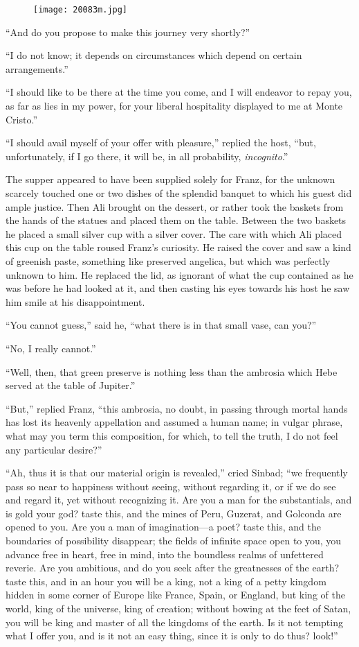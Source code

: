 \begin{figure}[ht]
\texttt{[image: 20083m.jpg]}
\end{figure}

“And do you propose to make this journey very shortly?”

“I do not know; it depends on circumstances which depend on certain
arrangements.”

“I should like to be there at the time you come, and I will endeavor to
repay you, as far as lies in my power, for your liberal hospitality
displayed to me at Monte Cristo.”

“I should avail myself of your offer with pleasure,” replied the host,
“but, unfortunately, if I go there, it will be, in all probability,
\textit{incognito}.”

The supper appeared to have been supplied solely for Franz, for the
unknown scarcely touched one or two dishes of the splendid banquet to
which his guest did ample justice. Then Ali brought on the dessert, or
rather took the baskets from the hands of the statues and placed them
on the table. Between the two baskets he placed a small silver cup with
a silver cover. The care with which Ali placed this cup on the table
roused Franz’s curiosity. He raised the cover and saw a kind of
greenish paste, something like preserved angelica, but which was
perfectly unknown to him. He replaced the lid, as ignorant of what the
cup contained as he was before he had looked at it, and then casting
his eyes towards his host he saw him smile at his disappointment.

“You cannot guess,” said he, “what there is in that small vase, can
you?”

“No, I really cannot.”

“Well, then, that green preserve is nothing less than the ambrosia
which Hebe served at the table of Jupiter.”

“But,” replied Franz, “this ambrosia, no doubt, in passing through
mortal hands has lost its heavenly appellation and assumed a human
name; in vulgar phrase, what may you term this composition, for which,
to tell the truth, I do not feel any particular desire?”

“Ah, thus it is that our material origin is revealed,” cried Sinbad;
“we frequently pass so near to happiness without seeing, without
regarding it, or if we do see and regard it, yet without recognizing
it. Are you a man for the substantials, and is gold your god? taste
this, and the mines of Peru, Guzerat, and Golconda are opened to you.
Are you a man of imagination—a poet? taste this, and the boundaries of
possibility disappear; the fields of infinite space open to you, you
advance free in heart, free in mind, into the boundless realms of
unfettered reverie. Are you ambitious, and do you seek after the
greatnesses of the earth? taste this, and in an hour you will be a
king, not a king of a petty kingdom hidden in some corner of Europe
like France, Spain, or England, but king of the world, king of the
universe, king of creation; without bowing at the feet of Satan, you
will be king and master of all the kingdoms of the earth. Is it not
tempting what I offer you, and is it not an easy thing, since it is
only to do thus? look!”

